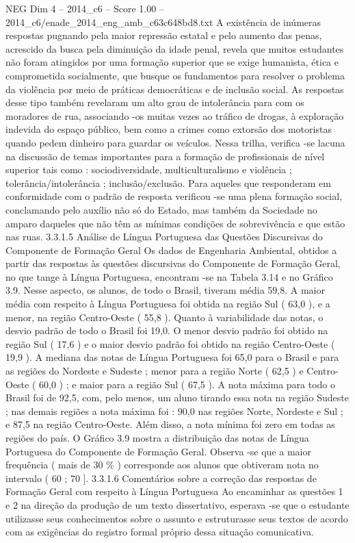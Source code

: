 \begin{textsample}{NEG Dim 4 – 2014\_c6 – Score 1.00 – 2014\_c6/enade\_2014\_eng\_amb\_c63c648bd8.txt}
A existência de inúmeras respostas pugnando pela maior repressão estatal e pelo aumento das penas, acrescido da busca pela diminuição da idade penal, revela que muitos estudantes não foram atingidos por uma formação superior que se exige humanista, ética e comprometida socialmente, que busque os fundamentos para resolver o problema da violência por meio de práticas democráticas e de inclusão social.
As respostas desse tipo também revelaram um alto grau de intolerância para com os moradores de rua, associando -os muitas vezes ao tráfico de drogas, à exploração indevida do espaço público, bem como a crimes como extorsão dos motoristas quando pedem dinheiro para guardar os veículos.
Nessa trilha, verifica -se lacuna na discussão de temas importantes para a formação de profissionais de nível superior tais como : sociodiversidade, multiculturalismo e violência ; tolerância/intolerância ; inclusão/exclusão.
Para aqueles que responderam em conformidade com o padrão de resposta verificou -se uma plena formação social, conclamando pelo auxílio não só do Estado, mas também da Sociedade no amparo daqueles que não têm as mínimas condições de sobrevivência e que estão nas ruas. 3.3.1.5 Análise de Língua Portuguesa das Questões Discursivas do Componente de Formação Geral Os dados de Engenharia Ambiental, obtidos a partir das respostas às questões discursivas do Componente de Formação Geral, no que tange à Língua Portuguesa, encontram -se na Tabela 3.14 e no Gráfico 3.9.
Nesse aspecto, os alunos, de todo o Brasil, tiveram média 59,8.
A maior média com respeito à Língua Portuguesa foi obtida na região Sul ( 63,0 ), e a menor, na região Centro-Oeste ( 55,8 ).
Quanto à variabilidade das notas, o desvio padrão de todo o Brasil foi 19,0.
O menor desvio padrão foi obtido na região Sul ( 17,6 ) e o maior desvio padrão foi obtido na região Centro-Oeste ( 19,9 ).
A mediana das notas de Língua Portuguesa foi 65,0 para o Brasil e para as regiões do Nordeste e Sudeste ; menor para a região Norte ( 62,5 ) e Centro-Oeste ( 60,0 ) ; e maior para a região Sul ( 67,5 ).
A nota máxima para todo o Brasil foi de 92,5, com, pelo menos, um aluno tirando essa nota na região Sudeste ; nas demais regiões a nota máxima foi : 90,0 nas regiões Norte, Nordeste e Sul ; e 87,5 na região Centro-Oeste.
Além disso, a nota mínima foi zero em todas as regiões do país.
O Gráfico 3.9 mostra a distribuição das notas de Língua Portuguesa do Componente de Formação Geral.
Observa -se que a maior frequência ( mais de 30 \% ) corresponde aos alunos que obtiveram nota no intervalo ( 60 ; 70 ]. 3.3.1.6 Comentários sobre a correção das respostas de Formação Geral com respeito à Língua Portuguesa Ao encaminhar as questões 1 e 2 na direção da produção de um texto dissertativo, esperava -se que o estudante utilizasse seus conhecimentos sobre o assunto e estruturasse seus textos de acordo com as exigências do registro formal próprio dessa situação comunicativa.

\end{textsample}
